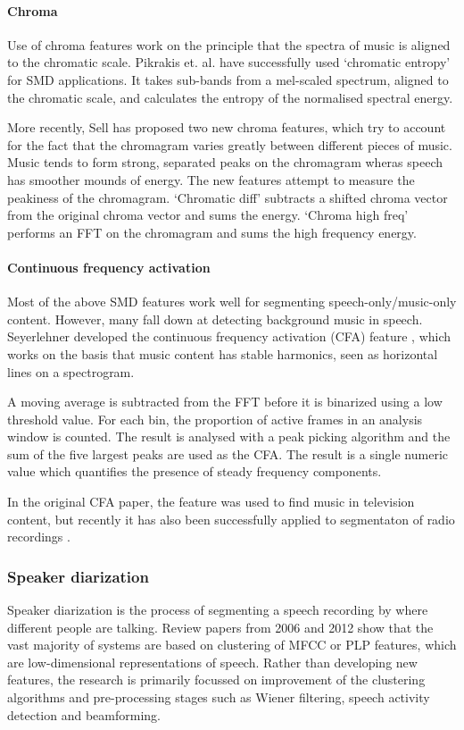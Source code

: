 \paragraph{Chroma}
Use of chroma features work on the principle that the spectra of music is
aligned to the chromatic scale. Pikrakis et. al.
\cite{Pikrakis2006,Pikrakis2008} have successfully used `chromatic entropy' for
SMD applications. It takes sub-bands from a mel-scaled spectrum, aligned to the
chromatic scale, and calculates the entropy of the normalised spectral energy.

More recently, Sell \cite{Sell2014} has proposed two new chroma features, which
try to account for the fact that the chromagram varies greatly between
different pieces of music. Music tends to form strong, separated peaks on the
chromagram wheras speech has smoother mounds of energy. The new features
attempt to measure the peakiness of the chromagram. `Chromatic diff' subtracts
a shifted chroma vector from the original chroma vector and sums the energy. 
`Chroma high freq' performs an FFT on the chromagram and sums the high
frequency energy.

\paragraph{Continuous frequency activation}
Most of the above SMD features work well for segmenting speech-only/music-only
content. However, many fall down at detecting background music in speech.
Seyerlehner developed the continuous frequency activation (CFA) feature
\cite{Seyerlehner2007}, which works on the basis that music content has stable
harmonics, seen as horizontal lines on a spectrogram.

A moving average is subtracted from the FFT before it is binarized using a low
threshold value. For each bin, the proportion of active frames in an analysis
window is counted. The result is analysed with a peak picking algorithm and the
sum of the five largest peaks are used as the CFA. The result is a single
numeric value which quantifies the presence of steady frequency components.

In the original CFA paper, the feature was used to find music in television
content, but recently it has also been successfully applied to segmentaton of
radio recordings \cite{Wieser2014}.

\subsubsection{Speaker diarization}
Speaker diarization is the process of segmenting a speech recording by where
different people are talking. Review papers from 2006 \cite{Tranter2006} and
2012 \cite{AngueraMiro2012} show that the vast majority of systems are based on
clustering of MFCC or PLP features, which are low-dimensional representations
of speech. Rather than developing new features, the research is primarily
focussed on improvement of the clustering algorithms and pre-processing stages
such as Wiener filtering, speech activity detection and beamforming.

